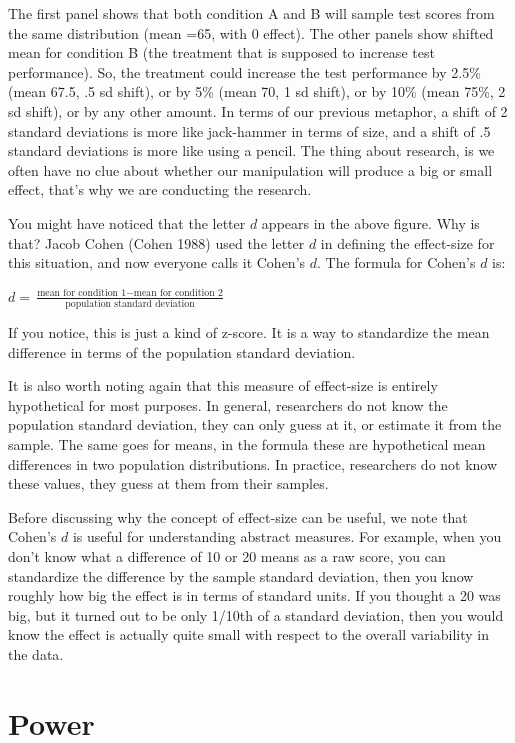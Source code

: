 \documentclass[
  letterpaper,
  DIV=11,
  numbers=noendperiod]{scrreprt}
\begin{document}
The first panel shows that both condition A and B will sample test
scores from the same distribution (mean =65, with 0 effect). The other
panels show shifted mean for condition B (the treatment that is supposed
to increase test performance). So, the treatment could increase the test
performance by 2.5\% (mean 67.5, .5 sd shift), or by 5\% (mean 70, 1 sd
shift), or by 10\% (mean 75\%, 2 sd shift), or by any other amount. In
terms of our previous metaphor, a shift of 2 standard deviations is more
like jack-hammer in terms of size, and a shift of .5 standard deviations
is more like using a pencil. The thing about research, is we often have
no clue about whether our manipulation will produce a big or small
effect, that's why we are conducting the research.

You might have noticed that the letter \(d\) appears in the above
figure. Why is that? Jacob Cohen (Cohen 1988) used the letter \(d\) in
defining the effect-size for this situation, and now everyone calls it
Cohen's \(d\). The formula for Cohen's \(d\) is:

\(d = \frac{\text{mean for condition 1} - \text{mean for condition 2}}{\text{population standard deviation}}\)

If you notice, this is just a kind of z-score. It is a way to
standardize the mean difference in terms of the population standard
deviation.

It is also worth noting again that this measure of effect-size is
entirely hypothetical for most purposes. In general, researchers do not
know the population standard deviation, they can only guess at it, or
estimate it from the sample. The same goes for means, in the formula
these are hypothetical mean differences in two population distributions.
In practice, researchers do not know these values, they guess at them
from their samples.

Before discussing why the concept of effect-size can be useful, we note
that Cohen's \(d\) is useful for understanding abstract measures. For
example, when you don't know what a difference of 10 or 20 means as a
raw score, you can standardize the difference by the sample standard
deviation, then you know roughly how big the effect is in terms of
standard units. If you thought a 20 was big, but it turned out to be
only 1/10th of a standard deviation, then you would know the effect is
actually quite small with respect to the overall variability in the
data.

\section{Power}\label{power}
\end{document}
